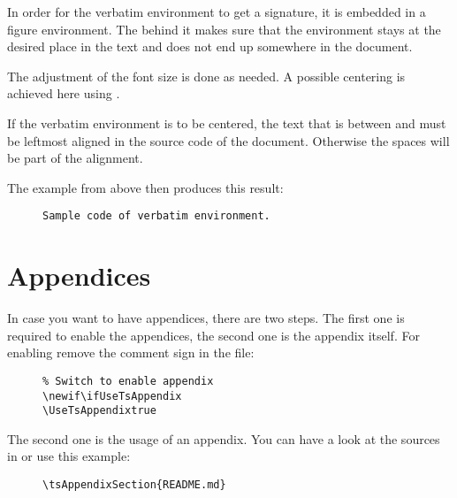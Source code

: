 In order for the verbatim environment to get a signature, it is embedded in a
figure environment. The \tsTextMonospace{[H]} behind it makes sure that the
environment stays at the desired place in the text and does not end up
somewhere in the document.
\bigbreak

The adjustment of the font size is done as needed. A possible centering  is
achieved here using .
\bigbreak

 If the verbatim environment is to be centered, the text that
is between  and
 must be leftmost aligned in the
source code of the document. Otherwise the spaces will be part of the
alignment.
\bigbreak

The example from above then produces this result:

\begin{figure}[H]
    \small
    \centering
    \begin{BVerbatim}
Sample code of verbatim environment.
    \end{BVerbatim}
\end{figure}

\section{Appendices}

In case you want to have appendices, there are two steps. The first one is
required to enable the appendices, the second one is the appendix itself.
For enabling remove the comment sign in the 
file:

\begin{figure}[H]
    \small
    \centering
    \begin{BVerbatim}
\newif\ifUseTsAppendix
\UseTsAppendixtrue
    \end{BVerbatim}
\end{figure}

The second one is the usage of an appendix. You can have a look at the sources
in  or use this example:

\begin{figure}[H]
    \small
    \centering
    \begin{BVerbatim}
\tsAppendixSection{README.md}
    \end{BVerbatim}
\end{figure}

